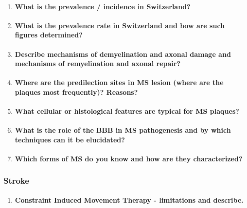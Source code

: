 \documentclass[12pt,article,oneside,a4paper]{memoir}
\begin{document}
\begin{enumerate}
\item \paragraph{What is the prevalence / incidence in Switzerland?}

\item \paragraph{What is the prevalence rate in Switzerland and how are such figures determined?}

\item \paragraph{Describe mechanisms of demyelination and axonal damage and mechanisms of remyelination and axonal repair?}

\item \paragraph{Where are the predilection sites in MS lesion (where are the plaques most frequently)? Reasons?}

\item \paragraph{What cellular or histological features are typical for MS plaques?}

\item \paragraph{What is the role of the BBB in MS pathogenesis and by which techniques can it be elucidated?}

\item \paragraph{Which forms of MS do you know and how are they characterized?}
\end{enumerate}

\subsubsection{Stroke}
\begin{enumerate}
\item \paragraph{Constraint Induced Movement Therapy - limitations and describe.}
\end{enumerate}
\end{document}

